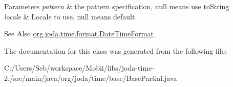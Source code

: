 \begin{DoxyParams}{Parameters}
{\em pattern} & the pattern specification, null means use {\ttfamily to\-String} \\
\hline
{\em locale} & Locale to use, null means default \\
\hline
\end{DoxyParams}
\begin{DoxySeeAlso}{See Also}
\hyperlink{classorg_1_1joda_1_1time_1_1format_1_1_date_time_format}{org.\-joda.\-time.\-format.\-Date\-Time\-Format} 
\end{DoxySeeAlso}


The documentation for this class was generated from the following file\-:\begin{DoxyCompactItemize}
\item 
C\-:/\-Users/\-Seb/workspace/\-Mobii/libs/joda-\/time-\/2./src/main/java/org/joda/time/base/Base\-Partial.\-java\end{DoxyCompactItemize}
